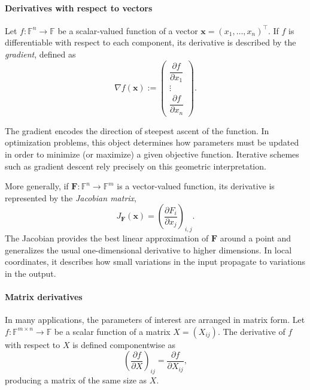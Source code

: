 \paragraph{Derivatives with respect to vectors}
Let $f : \mathbb{F}^n \to \mathbb{F}$ be a scalar-valued function of a vector 
$\mathbf{x} = (x_1, \dots, x_n)^\top$. 
If $f$ is differentiable with respect to each component, its derivative is described by the \emph{gradient}, defined as
\begin{equation}
    \nabla f(\mathbf{x}) :=
    \begin{pmatrix}
        \dfrac{\partial f}{\partial x_1} \\
        \vdots \\
        \dfrac{\partial f}{\partial x_n}
    \end{pmatrix}.
\end{equation}

The gradient encodes the direction of steepest ascent of the function. In optimization problems, this object determines how parameters must be updated in order to minimize (or maximize) a given objective function. Iterative schemes such as gradient descent rely precisely on this geometric interpretation.

More generally, if $\mathbf{F} : \mathbb{F}^n \to \mathbb{F}^m$ is a vector-valued function, its derivative is represented by the \emph{Jacobian matrix},
\begin{equation}
    J_{\mathbf{F}}(\mathbf{x})
    =
    \left(
    \frac{\partial F_i}{\partial x_j}
    \right)_{i,j}.
\end{equation}
The Jacobian provides the best linear approximation of $\mathbf{F}$ around a point and generalizes the usual one-dimensional derivative to higher dimensions. In local coordinates, it describes how small variations in the input propagate to variations in the output.

\paragraph{Matrix derivatives}
In many applications, the parameters of interest are arranged in matrix form. Let $f : \mathbb{F}^{m \times n} \to \mathbb{F}$ be a scalar function of a matrix $X = (X_{ij})$. The derivative of $f$ with respect to $X$ is defined componentwise as
\begin{equation}
    \left( \frac{\partial f}{\partial X} \right)_{ij} 
    = 
    \frac{\partial f}{\partial X_{ij}},
\end{equation}
producing a matrix of the same size as $X$. 


